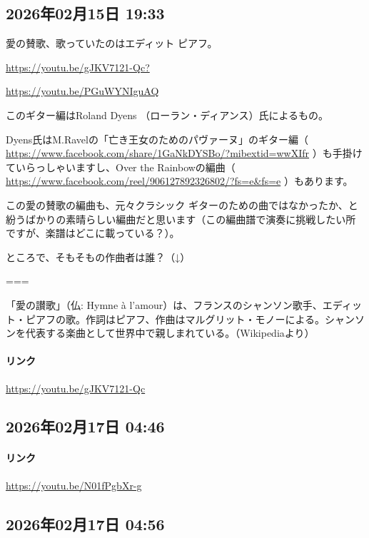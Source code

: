 \subsection*{2026年02月15日 19:33}

愛の賛歌、歌っていたのはエディット ピアフ。

\url{https://youtu.be/gJKV7121-Qc?}

\url{https://youtu.be/PGuWYNIguAQ}

このギター編はRoland Dyens （ローラン・ディアンス）氏によるもの。

Dyens氏はM.Ravelの「亡き王女のためのパヴァーヌ」のギター編（ \url{https://www.facebook.com/share/1GaNkDYSBo/?mibextid=wwXIfr} ）も手掛けていらっしゃいますし、Over the Rainbowの編曲（ \url{https://www.facebook.com/reel/906127892326802/?fs=e&fs=e} ）もあります。

この愛の賛歌の編曲も、元々クラシック ギターのための曲ではなかったか、と紛うばかりの素晴らしい編曲だと思います（この編曲譜で演奏に挑戦したい所ですが、楽譜はどこに載っている？）。

ところで、そもそもの作曲者は誰？（↓）

===

「愛の讃歌」（仏: Hymne à l'amour）は、フランスのシャンソン歌手、エディット・ピアフの歌。作詞はピアフ、作曲はマルグリット・モノーによる。シャンソンを代表する楽曲として世界中で親しまれている。（Wikipediaより）

\paragraph{リンク}
\url{https://youtu.be/gJKV7121-Qc}

\subsection*{2026年02月17日 04:46}

\paragraph{リンク}
\url{https://youtu.be/N01fPgbXr-g}

\subsection*{2026年02月17日 04:56}

